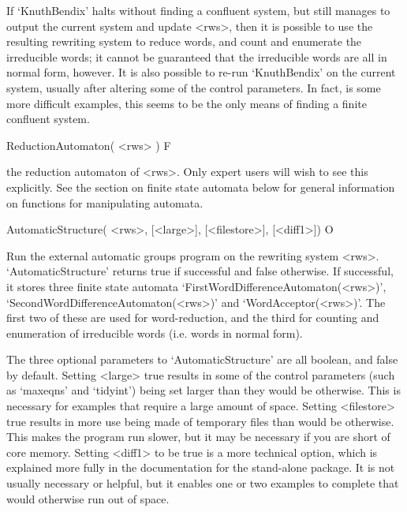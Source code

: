 If `KnuthBendix' halts without finding a confluent system, but still manages to
output the current system and update <rws>, then it is possible to use
the  resulting   rewriting system  to  reduce  words,  and  count  and
enumerate   the irreducible words; it  cannot   be guaranteed that the
irreducible words are all in normal form, however. It is also possible
to re-run `KnuthBendix'  on the current system,  usually after altering some of
the control parameters. In fact, is some more difficult examples, this
seems to be the only means of finding a finite confluent system.

\>ReductionAutomaton( <rws> ) F

the reduction automaton of <rws>. Only expert users will wish to see this
explicitly.  See the section on finite state automata below for general
information on functions for manipulating automata.



\>AutomaticStructure( <rws>, [<large>], [<filestore>], [<diff1>]) O

Run  the  external automatic groups  program  on  the rewriting system
<rws>.  `AutomaticStructure' returns true if successful and false otherwise. If
successful, it stores three finite state automata
`FirstWordDifferenceAutomaton(<rws>)', `SecondWordDifferenceAutomaton(<rws>)'
and `WordAcceptor(<rws>)'. The  first two  of  these  are used    for
word-reduction, and   the   third for counting     and enumeration of
irreducible words (i.e. words in normal  form).

The three optional parameters to `AutomaticStructure' are all boolean, and
false by  default.  Setting  <large>  true results in   some of  the control
parameters (such as  `maxeqns'  and `tidyint') being   set
larger than they would be   otherwise. This is necessary for  examples
that require a large amount of space. Setting <filestore> true results
in more  use being made  of temporary files  than would  be otherwise.
This makes the program run slower, but it may be  necessary if you are
short of  core memory. Setting <diff1> to  be true is a more technical
option, which is  explained more fully   in the documentation for  the
stand-alone {\KBMAG} package. It is not  usually necessary or helpful,
but it enables  one or two  examples to complete  that would otherwise
run out of space.

